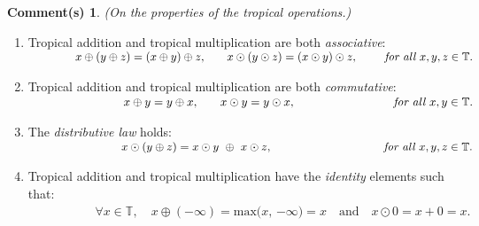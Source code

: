 \documentclass[]{article}
\theoremstyle{definition}
\numberwithin{equation}{section}
\newtheorem*{blub}{Comment(s)}
\renewcommand{\.}{\,.}
\begin{document}
\begin{blub} \emph{(On the properties of the tropical operations.)} 	
	\begin{enumerate}[noitemsep,topsep=-2pt]
		\item Tropical addition and tropical multiplication are both \emph{associative}: \vspace{0.75mm}
			\\ 
			$\begin{gathered}
		\quad \quad  \quad  \quad	x \oplus (y \oplus z)  = (x \oplus y) \oplus z \textrm{,} \quad \quad   x \odot (y \odot z)= (x \odot y)\odot z,\quad \quad  \emph{ \textrm{for all }} x, y, z \in \mathbb{T}.  
			\end{gathered}$  \vspace{3mm}
			\item Tropical addition and tropical multiplication are both \emph{commutative}: \vspace{0.75mm}
		\\ 
			$\begin{gathered}
		\quad \quad \quad \quad \quad \quad \quad \quad	x \oplus y  = y \oplus x\textrm{,}  \quad \quad x \odot y = y \odot x, \quad \quad \quad \quad \quad \quad  \quad \quad  \emph{ \textrm{for all }} x, y \in \mathbb{T}.  
		\end{gathered}$ \vspace{3mm}
		\item The \emph{distributive law} holds:
		\vspace{0.5mm}
		\\ 
		$\begin{gathered}
			\quad   \quad \quad \quad \quad \quad \quad \quad x \odot (y \oplus z)= x \odot y  \textrm{ }  \oplus \textrm{ } x \odot z, \quad \quad \quad \quad \quad  \quad \quad\quad \textrm{     }  \quad \emph{ \textrm{for all }} x, y, z \in \mathbb{T}.  
		\end{gathered}$ \vspace{3mm} 
		\item Tropical addition and tropical multiplication have the \emph{identity} elements such that: \\ 	\vspace{0.75mm} 
		$\begin{gathered}
		\quad  \quad \quad  \quad \quad	\forall x \in \mathbb{T}, \quad x \oplus (-\infty) = \textrm{max($x$, $-\infty$)}=x \quad \textrm{and} \quad x \odot 0 = x + 0=x.   \label{fund2}
		\end{gathered}$  \vspace{1mm} \\ 

\end{enumerate}
\end{blub}
\end{document}
